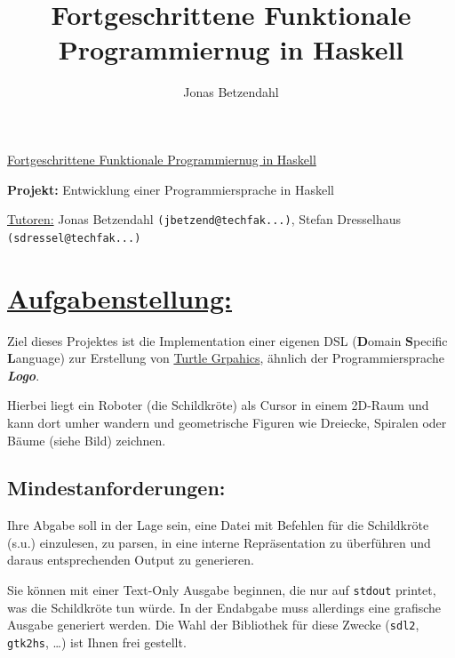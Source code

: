 \documentclass[10pt,a4paper]{article}
\author{Jonas Betzendahl}
\title{Fortgeschrittene Funktionale Programmiernug in Haskell}
\begin{document}
\huge \underline{Fortgeschrittene Funktionale Programmiernug in Haskell}\smallskip

\Large
\begin{center}
\textbf{Projekt:} Entwicklung einer Programmiersprache in Haskell\bigskip

\normalsize
\underline{Tutoren:}
Jonas Betzendahl \texttt{(jbetzend@techfak...)},
Stefan Dresselhaus \texttt{(sdressel@techfak...)}
\end{center}
\normalsize

\section*{\underline{Aufgabenstellung:}}

Ziel dieses Projektes ist die Implementation einer eigenen DSL (\textbf{D}omain \textbf{S}pecific \textbf{L}anguage) zur Erstellung von \href{http://en.wikipedia.org/wiki/Turtle_graphics}{Turtle Grpahics}, ähnlich der Programmiersprache \emph{\textbf{Logo}}.

Hierbei liegt ein Roboter (die \glqq Schildkröte\grqq ) als Cursor in einem 2D-Raum und kann dort umher wandern und geometrische Figuren wie Dreiecke, Spiralen oder Bäume (siehe Bild) zeichnen. 

\subsection*{Mindestanforderungen:}

Ihre Abgabe soll in der Lage sein, eine Datei mit Befehlen für die Schildkröte (s.u.) einzulesen, zu parsen, in eine interne Repräsentation zu überführen und daraus entsprechenden Output zu generieren.\smallskip\smallskip

Sie können mit einer Text-Only Ausgabe beginnen, die nur auf \texttt{stdout} printet, was die Schildkröte tun würde. In der Endabgabe muss allerdings eine grafische Ausgabe generiert werden. Die Wahl der Bibliothek für diese Zwecke (\texttt{sdl2}, \texttt{gtk2hs}, \dots) ist Ihnen frei gestellt.\smallskip\smallskip
\end{document}
